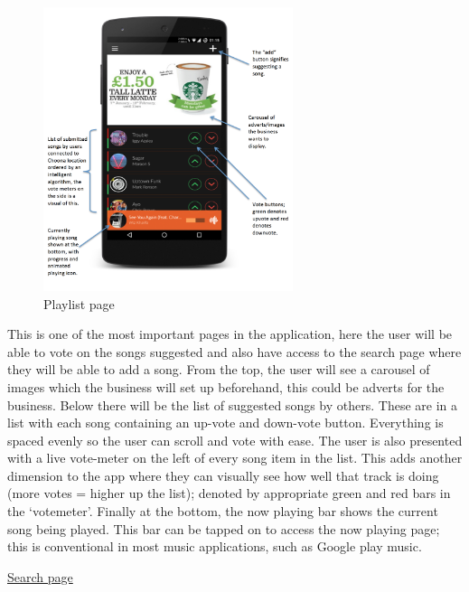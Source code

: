 \noindent
\begin{figure}[h!]
\centering
\includegraphics[width=0.65\textwidth]{./img/playlistannotated.png}
\caption{Playlist page}
\label{fig:playlist}
\end{figure}

This is one of the most important pages in the application, here the user will be able to vote on the songs suggested and also have access to the search page where they will be able to add a song. From the top, the user will see a carousel of images which the business will set up beforehand, this could be adverts for the business. Below there will be the list of suggested songs by others. These are in a list with each song containing an up-vote and down-vote button.  Everything is spaced evenly so the user can scroll and vote with ease. The user is also presented with a live vote-meter on the left of every song item in the list. This adds another dimension to the app where they can visually see how well that track is doing (more votes = higher up the list); denoted by appropriate green and red bars in the `votemeter'. Finally at the bottom, the now playing bar shows the current song being played. This bar can be tapped on to access the now playing page; this is conventional in most music applications, such as Google play music.

\clearpage


\noindent\underline{Search page}\newline

